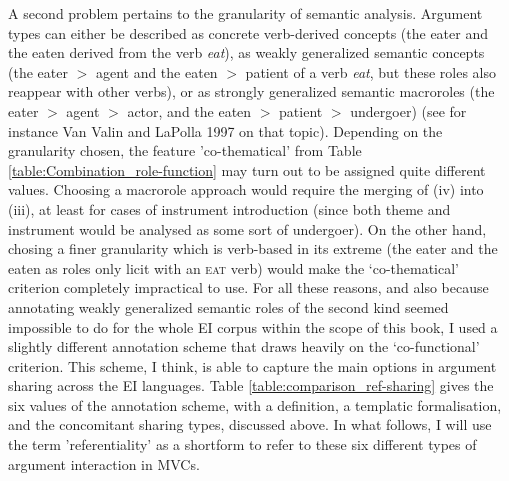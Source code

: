 A second problem pertains to the granularity of semantic analysis. Argument types can either be described as concrete verb-derived concepts (the eater and the eaten derived from the verb \textit{eat}), as weakly generalized semantic concepts (the eater $>$ agent and the eaten $>$ patient of a verb \textit{eat}, but these roles also reappear with other verbs), or as strongly generalized semantic macroroles (the eater $>$ agent $>$ actor, and the eaten $>$ patient $>$ undergoer) (see for instance Van Valin and LaPolla 1997 on that topic). Depending on the granularity chosen, the feature 'co-thematical' from Table \ref{table:Combination_role-function} may turn out to be assigned quite different values. Choosing a macrorole approach would require the merging of (iv) into (iii), at least for cases of instrument introduction (since both theme and instrument would be analysed as some sort of undergoer). On the other hand, chosing a finer granularity which is verb-based in its extreme (the eater and the eaten as roles only licit with an \textsc{eat} verb) would make the `co-thematical' criterion completely impractical to use. For all these reasons, and also because annotating weakly generalized semantic roles of the second kind seemed impossible to do for the whole EI corpus within the scope of this book, I used a slightly different annotation scheme that draws heavily on the `co-functional' criterion. This scheme, I think, is able to capture the main options in argument sharing across the EI languages. Table \ref{table:comparison_ref-sharing} gives the six values of the annotation scheme, with a definition, a templatic formalisation, and the concomitant sharing types, discussed above. In what follows, I will use the term 'referentiality' as a shortform to refer to these six different types of argument interaction in MVCs.

